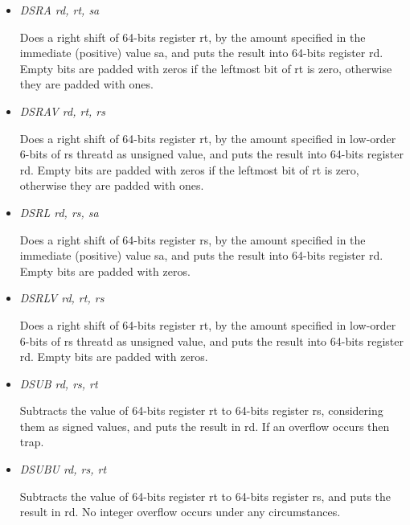\documentclass[letterpaper,10pt,english]{sphinxmanual}
\begin{document}
\begin{itemize}
\item {} 
\emph{DSRA rd, rt, sa}

Does a right shift of 64-bits register rt, by the amount specified in the immediate (positive) value sa, and puts the result into 64-bits register rd. Empty bits are padded with zeros if the leftmost bit of rt is zero, otherwise they are padded with ones.

\item {} 
\emph{DSRAV rd, rt, rs}

Does a right shift of 64-bits register rt, by the amount specified in low-order 6-bits of rs threatd as unsigned value, and puts the result into 64-bits register rd. Empty bits are padded with zeros if the leftmost bit of rt is zero, otherwise they are padded with ones.

\item {} 
\emph{DSRL rd, rs, sa}

Does a right shift of 64-bits register rs, by the amount specified in the immediate (positive) value sa, and puts the result into 64-bits register rd. Empty bits are padded with zeros.

\item {} 
\emph{DSRLV rd, rt, rs}

Does a right shift of 64-bits register rt, by the amount specified in low-order 6-bits of rs threatd as unsigned value, and puts the result into 64-bits register rd. Empty bits are padded with zeros.

\item {} 
\emph{DSUB rd, rs, rt}

Subtracts the value of 64-bits register rt to 64-bits register rs, considering them as signed values, and puts the result in rd. If an overflow occurs then trap.

\item {} 
\emph{DSUBU rd, rs, rt}

Subtracts the value of 64-bits register rt to 64-bits register rs, and puts the result in rd.  No integer overflow occurs under any circumstances.

\end{itemize}
\end{document}
